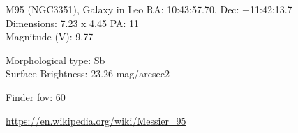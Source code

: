 \begin{block}{M95 (NGC3351), Galaxy in Leo}
    RA: 10:43:57.70, Dec: +11:42:13.7 \\ 
    Dimensions: 7.23 x 4.45 PA: 11 \\ 
    Magnitude (V): 9.77

    Morphological type: Sb \\ 
    Surface Brightness: 23.26 mag/arcsec2 


    Finder fov: 60 

    \url{https://en.wikipedia.org/wiki/Messier_95} 
\end{block}